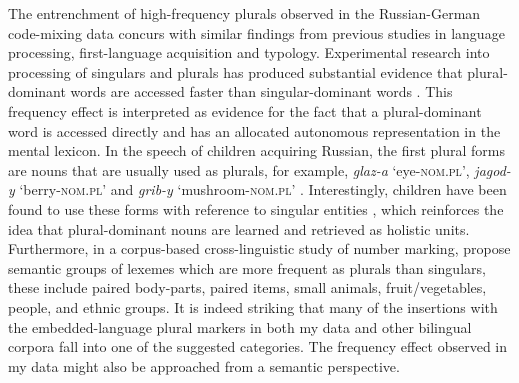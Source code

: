 The entrenchment of high-frequency plurals observed in the Russian-German code-mixing data concurs with similar findings from previous studies in language processing, first-language acquisition and typology. Experimental research into processing of singulars and plurals has produced substantial evidence that plural-dominant words are accessed faster than singular-dominant words \citep{new-etal-2004,sereno-jongman-1997,baayen-dijkstra-schreuder}. This frequency effect is interpreted as evidence for the fact that a plural-dominant word is accessed directly and has an allocated autonomous representation in the mental lexicon. In the speech of children acquiring Russian, the first plural forms are nouns that are usually used as plurals, for example, \textit{glaz-a} `eye-\textsc{nom.pl}', \textit{jagod-y} `berry-\textsc{nom.pl}' and \textit{grib-y} `mushroom-\textsc{nom.pl}' \citep[198]{gagarina-voeikova}. Interestingly, children have been found to use these forms with reference to singular entities \citep[91]{ceitlin}, which reinforces the idea that plural-dominant nouns are learned and retrieved as holistic units. Furthermore, in a corpus-based cross-linguistic study of number marking, \cite{haspelmath-karjus} propose semantic groups of lexemes which are more frequent as plurals than singulars, these include paired body-parts, paired items, small animals, fruit/vegetables, people, and ethnic groups. It is indeed striking that many of the insertions with the embedded-language plural markers in both my data and other bilingual corpora fall into one of the suggested categories. The frequency effect observed in my data might also be approached from a semantic perspective.


